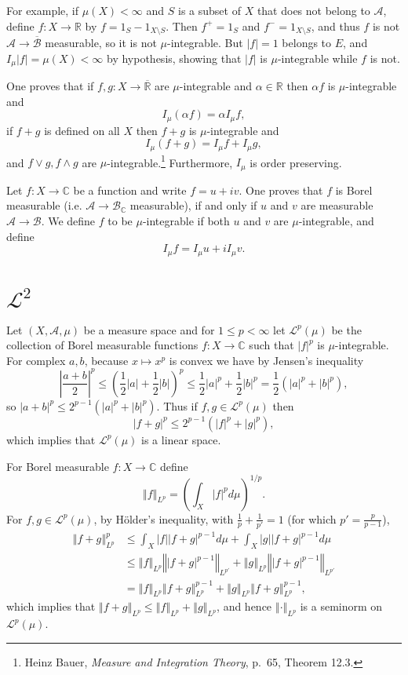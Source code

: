 \documentclass{article}
\newcommand{\norm}[1]{\left\Vert #1 \right\Vert}
\theoremstyle{definition}
\begin{document}
For example, if  $\mu(X)<\infty$ and   $S$ is a subset of $X$ that does not belong to $\mathscr{A}$, define $f:X \to \mathbb{R}$
by $f = 1_S - 1_{X \setminus S}$. Then  $f^+=1_S$ and $f^-=1_{X \setminus S}$, and thus $f$ is not $\mathscr{A} \to \overline{\mathscr{B}}$
measurable, so it is not $\mu$-integrable. But $|f|=1$ belongs to $E$, and $I_\mu |f| = \mu(X)<\infty$ by hypothesis, showing
that $|f|$ is $\mu$-integrable while $f$ is not. 

One proves that if $f,g:X \to \overline{\mathbb{R}}$ are $\mu$-integrable and $\alpha \in \mathbb{R}$ then 
$\alpha f$ is $\mu$-integrable and
\[
I_\mu (\alpha f) = \alpha I_\mu f,
\]
if $f+g$ is defined on all $X$ then $f+g$ is $\mu$-integrable and 
\[
I_\mu(f+g) = I_\mu f+ I_\mu g,
\]
and $f \vee g, f \wedge g$ are $\mu$-integrable.\footnote{Heinz Bauer,
{\em Measure and Integration Theory}, p.~65, Theorem 12.3.}
Furthermore, $I_\mu$ is order preserving.

Let $f:X \to \mathbb{C}$ be a function and write $f=u+iv$. One proves that $f$ is Borel measurable (i.e.
$\mathscr{A} \to \mathscr{B}_\mathbb{C}$ measurable), if and only if $u$ and $v$ are measurable $\mathscr{A} \to \mathscr{B}$. 
We define $f$ to be $\mu$-integrable if both $u$ and $v$ are $\mu$-integrable, and define 
\[
I_\mu f = I_\mu u + i I_\mu v.
\]







\section{$\mathscr{L}^2$}
Let $(X,\mathscr{A},\mu)$ be a measure space and
for $1 \leq p < \infty$ let $\mathscr{L}^p(\mu)$ be the collection
of Borel measurable functions $f:X \to \mathbb{C}$ such that $|f|^p$ is $\mu$-integrable. 
For  complex $a,b$, because
$x \mapsto x^p$ is convex we have by Jensen's inequality
\[
\left| \frac{a+b}{2} \right|^p \leq \left( \frac{1}{2}|a| + \frac{1}{2}|b| \right)^p
\leq \frac{1}{2} |a|^p + \frac{1}{2}|b|^p=\frac{1}{2}(|a|^p+|b|^p),
\]
so $|a+b|^p \leq 2^{p-1} (|a|^p+|b|^p)$. Thus if $f,g \in \mathscr{L}^p(\mu)$ then
\[
|f+g|^p \leq 2^{p-1}(|f|^p+|g|^p),
\]
 which implies that $\mathscr{L}^p(\mu)$ is a linear space. 

For Borel measurable $f:X \to \mathbb{C}$ define
\[
\norm{f}_{L^p} = \left( \int_X |f|^p d\mu \right)^{1/p}.
\]
For $f,g \in \mathscr{L}^p(\mu)$, by H\"older's inequality, with $\frac{1}{p}+\frac{1}{p'}=1$ (for which $p'=\frac{p}{p-1}$),
\begin{align*}
\norm{f+g}_{L^p}^p& \leq \int_X |f| |f+g|^{p-1} d\mu
+\int_X |g| |f+g|^{p-1} d\mu\\
&\leq \norm{f}_{L^p} \norm{|f+g|^{p-1}}_{L^{p'}} + \norm{g}_{L^p} \norm{|f+g|^{p-1}}_{L^{p'}}\\
&= \norm{f}_{L^p} \norm{f+g}_{L^p}^{p-1} + \norm{g}_{L^p} \norm{f+g}_{L^p}^{p-1},
\end{align*}
which implies that $\norm{f+g}_{L^p} \leq \norm{f}_{L^p} + \norm{g}_{L^p}$, and hence $\norm{\cdot}_{L^p}$ is
a seminorm on $\mathscr{L}^p(\mu)$. 
\end{document}
